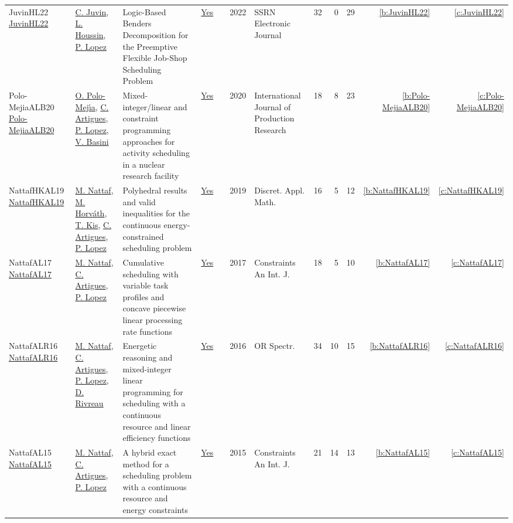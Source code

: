 {\begin{longtable}{>{\raggedright\arraybackslash}p{3cm}>{\raggedright\arraybackslash}p{6cm}>{\raggedright\arraybackslash}p{6.5cm}rrrp{2.5cm}rrrrr}
JuvinHL22 \href{http://dx.doi.org/10.2139/ssrn.4068164}{JuvinHL22} & \hyperref[auth:a0]{C. Juvin}, \hyperref[auth:a2]{L. Houssin}, \hyperref[auth:a3]{P. Lopez} & Logic-Based Benders Decomposition for the Preemptive Flexible Job-Shop Scheduling Problem & \href{works/JuvinHL22.pdf}{Yes} & \cite{JuvinHL22} & 2022 & SSRN Electronic Journal & 32 & 0 & 29 & \ref{b:JuvinHL22} & \ref{c:JuvinHL22}\\
Polo-MejiaALB20 \href{https://doi.org/10.1080/00207543.2019.1693654}{Polo-MejiaALB20} & \hyperref[auth:a524]{O. Polo{-}Mej{\'{\i}}a}, \hyperref[auth:a6]{C. Artigues}, \hyperref[auth:a3]{P. Lopez}, \hyperref[auth:a525]{V. Basini} & Mixed-integer/linear and constraint programming approaches for activity scheduling in a nuclear research facility & \href{works/Polo-MejiaALB20.pdf}{Yes} & \cite{Polo-MejiaALB20} & 2020 & International Journal of Production Research & 18 & 8 & 23 & \ref{b:Polo-MejiaALB20} & \ref{c:Polo-MejiaALB20}\\
NattafHKAL19 \href{https://doi.org/10.1016/j.dam.2018.11.008}{NattafHKAL19} & \hyperref[auth:a81]{M. Nattaf}, \hyperref[auth:a1023]{M. Horv{\'{a}}th}, \hyperref[auth:a157]{T. Kis}, \hyperref[auth:a6]{C. Artigues}, \hyperref[auth:a3]{P. Lopez} & Polyhedral results and valid inequalities for the continuous energy-constrained scheduling problem & \href{works/NattafHKAL19.pdf}{Yes} & \cite{NattafHKAL19} & 2019 & Discret. Appl. Math. & 16 & 5 & 12 & \ref{b:NattafHKAL19} & \ref{c:NattafHKAL19}\\
NattafAL17 \href{https://doi.org/10.1007/s10601-017-9271-4}{NattafAL17} & \hyperref[auth:a81]{M. Nattaf}, \hyperref[auth:a6]{C. Artigues}, \hyperref[auth:a3]{P. Lopez} & Cumulative scheduling with variable task profiles and concave piecewise linear processing rate functions & \href{works/NattafAL17.pdf}{Yes} & \cite{NattafAL17} & 2017 & Constraints An Int. J. & 18 & 5 & 10 & \ref{b:NattafAL17} & \ref{c:NattafAL17}\\
NattafALR16 \href{https://doi.org/10.1007/s00291-015-0423-x}{NattafALR16} & \hyperref[auth:a81]{M. Nattaf}, \hyperref[auth:a6]{C. Artigues}, \hyperref[auth:a3]{P. Lopez}, \hyperref[auth:a1003]{D. Rivreau} & Energetic reasoning and mixed-integer linear programming for scheduling with a continuous resource and linear efficiency functions & \href{works/NattafALR16.pdf}{Yes} & \cite{NattafALR16} & 2016 & {OR} Spectr. & 34 & 10 & 15 & \ref{b:NattafALR16} & \ref{c:NattafALR16}\\
NattafAL15 \href{https://doi.org/10.1007/s10601-015-9192-z}{NattafAL15} & \hyperref[auth:a81]{M. Nattaf}, \hyperref[auth:a6]{C. Artigues}, \hyperref[auth:a3]{P. Lopez} & A hybrid exact method for a scheduling problem with a continuous resource and energy constraints & \href{works/NattafAL15.pdf}{Yes} & \cite{NattafAL15} & 2015 & Constraints An Int. J. & 21 & 14 & 13 & \ref{b:NattafAL15} & \ref{c:NattafAL15}\\

\end{longtable}}
